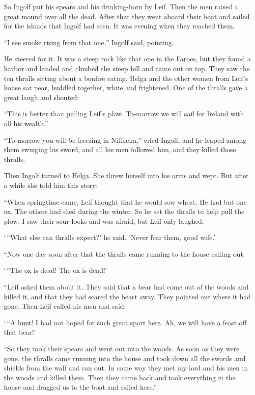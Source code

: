 So Ingolf put his spears and his drinking-horn by Leif. Then the men
raised a great mound over all the dead. After that they went aboard
their boat and sailed for the islands that Ingolf had seen. It was
evening when they reached them.

``I see smoke rising from that one,'' Ingolf said, pointing.

He steered for it. It was a steep rock like that one in the Faroes, but
they found a harbor and landed and climbed the steep hill and came out
on top. They saw the ten thralls sitting about a bonfire eating. Helga
and the other women from Leif's house sat near, huddled together, white
and frightened. One of the thralls gave a great laugh and shouted:

``This is better than pulling Leif's plow. To-morrow we will sail for
Ireland with all his wealth.''

``To-morrow you will be freezing in Niflheim,'' cried Ingolf, and he
leaped among them swinging his sword, and all his men followed him, and
they killed those thralls.

Then Ingolf turned to Helga. She threw herself into his arms and wept.
But after a while she told him this story:

``When springtime came, Leif thought that he would sow wheat. He had but
one ox. The others had died during the winter. So he set the thralls to
help pull the plow. I saw their sour looks and was afraid, but Leif only
laughed:

`\,``What else can thralls expect?' he said. `Never fear them, good wife.'

``Now one day soon after that the thralls came running to the house
calling out:

`\,``The ox is dead! The ox is dead!'

``Leif asked them about it. They said that a bear had come out of the
woods and killed it, and that they had scared the beast away. They
pointed out where it had gone. Then Leif called his men and said:

`\,``A hunt! I had not hoped for such great sport here. Ah, we will have a
feast off that bear!'

``So they took their spears and went out into the woods. As soon as they
were gone, the thralls came running into the house and took down all the
swords and shields from the wall and ran out. In some way they met my
lord and his men in the woods and killed them. Then they came back and
took everything in the house and dragged us to the boat and sailed
here.''

